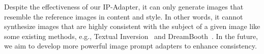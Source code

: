\documentclass{article}
\begin{document}
Despite the effectiveness of our IP-Adapter, it can only generate images that resemble the reference images in content and style. In other words, it cannot synthesize images that are highly consistent with the subject of a given image like some existing methods, e.g., Textual Inversion~\cite{gal2022image} and DreamBooth~\cite{ruiz2023dreambooth}. In the future, we aim to develop more powerful image prompt adapters to enhance consistency.

  
  
\end{document}
